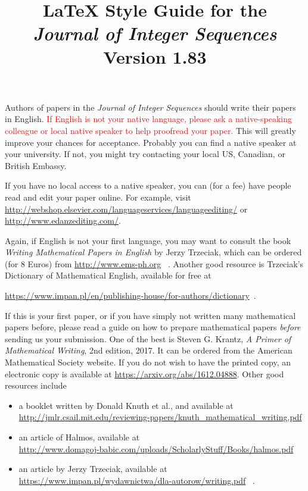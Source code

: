 \documentclass[12pt]{article}
\begin{document}
\title{LaTeX Style Guide for the\\
{\it Journal of Integer Sequences}\\
\large Version 1.83}

\date{}
\author{}
\maketitle

	Authors of papers in the {\it Journal of Integer Sequences} should
write their papers in English.  
\textcolor{red}{If English is not your native language,
please ask a native-speaking colleague or local native speaker to
help proofread your paper.}    This will greatly improve your chances for
acceptance.  Probably you can find a native speaker at your university.
If not, you might try contacting your local US, Canadian, or British Embassy.

If you have no local access to a native speaker, you can (for a fee) have
people read and edit your paper online.  For example, visit \newline
\url{http://webshop.elsevier.com/languageservices/languageediting/} or
\newline
\url{http://www.edanzediting.com/}.

Again, if English is not your first language, you may want to consult
the book {\it Writing Mathematical Papers in English} by Jerzy Trzeciak,
which can be ordered (for 8 Euros) from \url{http://www.ems-ph.org} \ .  
Another good
resource is Trzeciak's Dictionary of Mathematical English, available
for free at \\
\centerline{\url{https://www.impan.pl/en/publishing-house/for-authors/dictionary}\ .}

If this is your first paper, or if you have simply not written many mathematical papers before, please read a guide on how to prepare mathematical papers
{\it before\/} sending us your submission.
One of the best is Steven G. Krantz, {\it A Primer of Mathematical
Writing}, 2nd edition, 2017.  It can be ordered from the
American Mathematical Society website.  If you do not wish to have the printed
copy, an electronic copy is available at
\url{https://arxiv.org/abs/1612.04888}.
Other good resources include
\begin{itemize}
\item a booklet written by Donald Knuth et al., and
available at \\ \url{http://jmlr.csail.mit.edu/reviewing-papers/knuth_mathematical_writing.pdf} 
\item an article of Halmos, available at \\
\url{http://www.domagoj-babic.com/uploads/ScholarlyStuff/Books/halmos.pdf} 
\item an article by Jerzy Trzeciak, available at \\
\url{https://www.impan.pl/wydawnictwa/dla-autorow/writing.pdf} \ .
\end{itemize}
\end{document}
